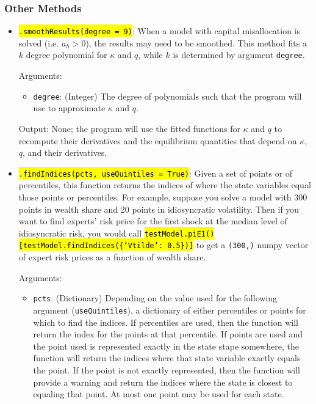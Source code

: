 \documentclass[12pt]{article}
\newcommand{\idioVolProg}{Vtilde}
\DeclareRobustCommand{\hlCODE}[1]{{\sethlcolor{backcolour}\hl{#1}}}
\begin{document}
\subsubsection{Other Methods}\label{section:otherMethods}
\begin{itemize}
		\item \hlCODE{\texttt{.smoothResults(degree = 9)}}: When a model with capital misallocation is solved (i.e. $a_h > 0$), the results may need to be smoothed. This method fits a $k$ degree polynomial for $\kappa$ and $q$, while $k$ is determined by argument \texttt{degree}.
		
		Arguments: 
		\begin{itemize}
		\item \texttt{degree}: (Integer) The degree of polynomials such that the program will use to approximate $\kappa$ and $q$.
		\end{itemize}
		 
		Output: None; the program will use the fitted functions for $\kappa$ and $q$ to recompute their derivatives and the equilibrium quantities that depend on $\kappa$, $q$, and their derivatives.
		
        \item \hlCODE{\texttt{.findIndices(pcts, useQuintiles = True)}}: Given a set of points or of percentiles, this
        function returns the indices of where the state variables equal those
        points or percentiles. For example, suppose you solve a model with 300
        points in wealth share and 20 points in idiosyncratic volatility. Then
        if you want to find experts' risk price for the first shock at the median
        level of idiosyncratic risk, you would call
        \hlCODE{\texttt{testModel.piE1()[testModel.findIndices(\{`\idioVolProg': 0.5\})]}}
        to get a \texttt{(300,)} numpy vector of expert risk prices as a
        function of wealth share.

        Arguments:
        \begin{itemize}
            \item \texttt{pcts}: (Dictionary) Depending on the value used for the following
            argument (\texttt{useQuintiles}), a dictionary of either percentiles
            or points for which to find the indices. If percentiles are used, then
            the function will return the index for the points at that percentile.
            If points are used and the point used is represented exactly in the state
            stape somewhere, the function will return the indices where that
            state variable exactly equals the point. If the point is not exactly
            represented, then the function will provide a warning and return the
            indices where the state is closest to equaling that point. At most
            one point may be used for each state.


\end{itemize}
\end{itemize}
\end{document}
